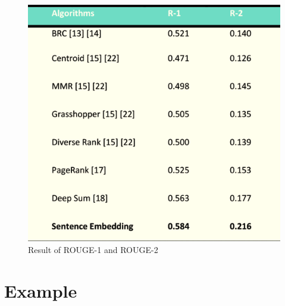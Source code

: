 \documentclass[a4paper,10pt, bibliography=totocnumbered]{scrreprt}
\begin{document}
\begin{figure}
\centering
\includegraphics[scale=0.65]{../images/Thema10_ROUGE.PNG}
\caption{Result of ROUGE-1 and ROUGE-2}
\label{fig:eva1}
\end{figure} 

\section{Example}
\end{document}
